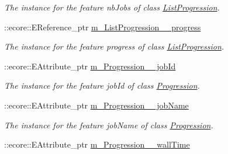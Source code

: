 \begin{DoxyCompactItemize}
\begin{DoxyCompactList}\small\item\em The instance for the feature nbJobs of class \hyperlink{classTMS__Data_1_1ListProgression}{ListProgression}. \item\end{DoxyCompactList}\item 
\hypertarget{classTMS__Data_1_1TMS__DataPackage_afaf129c36a375be1ce26e0ff54075026}{
::ecore::EReference\_\-ptr \hyperlink{classTMS__Data_1_1TMS__DataPackage_afaf129c36a375be1ce26e0ff54075026}{m\_\-ListProgression\_\-\_\-progress}}
\label{classTMS__Data_1_1TMS__DataPackage_afaf129c36a375be1ce26e0ff54075026}

\begin{DoxyCompactList}\small\item\em The instance for the feature progress of class \hyperlink{classTMS__Data_1_1ListProgression}{ListProgression}. \item\end{DoxyCompactList}\item 
\hypertarget{classTMS__Data_1_1TMS__DataPackage_a8caba3684ad9ce879aa6283778ac3c4c}{
::ecore::EAttribute\_\-ptr \hyperlink{classTMS__Data_1_1TMS__DataPackage_a8caba3684ad9ce879aa6283778ac3c4c}{m\_\-Progression\_\-\_\-jobId}}
\label{classTMS__Data_1_1TMS__DataPackage_a8caba3684ad9ce879aa6283778ac3c4c}

\begin{DoxyCompactList}\small\item\em The instance for the feature jobId of class \hyperlink{classTMS__Data_1_1Progression}{Progression}. \item\end{DoxyCompactList}\item 
\hypertarget{classTMS__Data_1_1TMS__DataPackage_a54fd1dfb0754969e6a9b819ed8ba40a6}{
::ecore::EAttribute\_\-ptr \hyperlink{classTMS__Data_1_1TMS__DataPackage_a54fd1dfb0754969e6a9b819ed8ba40a6}{m\_\-Progression\_\-\_\-jobName}}
\label{classTMS__Data_1_1TMS__DataPackage_a54fd1dfb0754969e6a9b819ed8ba40a6}

\begin{DoxyCompactList}\small\item\em The instance for the feature jobName of class \hyperlink{classTMS__Data_1_1Progression}{Progression}. \item\end{DoxyCompactList}\item 
\hypertarget{classTMS__Data_1_1TMS__DataPackage_a375ef1d345c324f4fbabe7e939dd87b9}{
::ecore::EAttribute\_\-ptr \hyperlink{classTMS__Data_1_1TMS__DataPackage_a375ef1d345c324f4fbabe7e939dd87b9}{m\_\-Progression\_\-\_\-wallTime}}
\label{classTMS__Data_1_1TMS__DataPackage_a375ef1d345c324f4fbabe7e939dd87b9}


\end{DoxyCompactItemize}
